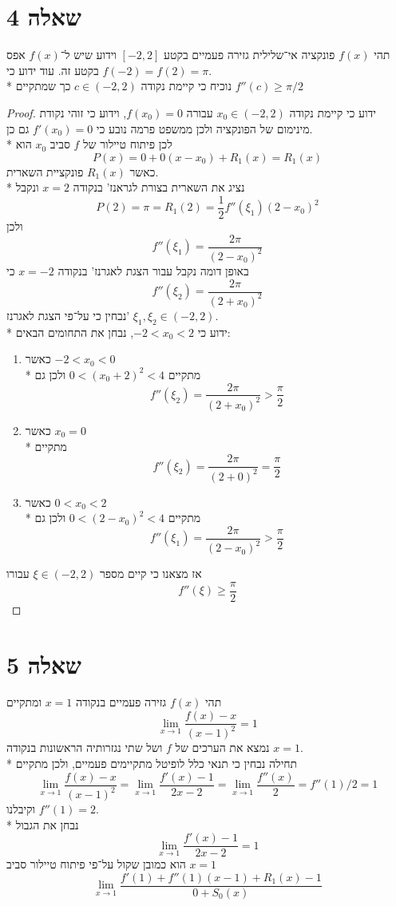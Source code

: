 \section{שאלה 4}
תהי $f(x)$ פונקציה אי־שלילית גזירה פעמיים בקטע $[-2, 2]$ וידוע שיש ל־$f(x)$ אפס בקטע זה. עוד ידוע כי $f(-2) = f(2) = \pi$. \\*
נוכיח כי קיימת נקודה $c \in (-2, 2)$ כך שמתקיים $f''(c) \ge \pi/2$
\begin{proof}
	ידוע כי קיימת נקודה $x_0 \in (-2, 2)$ עבורה $f(x_0) = 0$, וידוע כי זוהי נקודת מינימום של הפונקציה ולכן ממשפט פרמה נובע כי $f'(x_0) = 0$ גם כן. \\*
	לכן פיתוח טיילור של $f$ סביב $x_0$ הוא
	\[
		P(x) = 0 + 0(x - x_0) + R_1(x) = R_1(x)
	\]
	כאשר $R_1(x)$ פונקציית השארית. \\*
	נציג את השארית בצורת לגראנז' בנקודה $x = 2$ ונקבל
	\[
		P(2) = \pi = R_1(2) = \frac{1}{2} f''(\xi_1) {(2 - x_0)}^2
	\]
	ולכן
	\[
		f''(\xi_1) = \frac{2 \pi}{{(2 - x_0)}^2}
	\]
	באופן דומה נקבל עבור הצגת לאגרנז' בנקודה $x = -2$ כי
	\[
		f''(\xi_2) = \frac{2 \pi}{{(2 + x_0)}^2}
	\]
	נבחין כי על־פי הצגת לאגרנז' $\xi_1, \xi_2 \in (-2, 2)$. \\*
	ידוע כי $-2 < x_0 < 2$, נבחן את התחומים הבאים:
	\begin{enumerate}
		\item כאשר $-2 < x_0 < 0$ \\*
			מתקיים $0 < {(x_0 + 2)}^2 < 4$ ולכן גם
			\[
				f''(\xi_2) = \frac{2 \pi}{{(2 + x_0)}^2} > \frac{\pi}{2}
			\]
		\item כאשר $x_0 = 0$ \\*
			מתקיים
			\[
				f''(\xi_2) = \frac{2\pi}{{(2 + 0)}^2} = \frac{\pi}{2}
			\]
		\item כאשר $0 < x_0 < 2$ \\*
			מתקיים $0 < {(2 - x_0)}^2 < 4$ ולכן גם
			\[
				f''(\xi_1) = \frac{2 \pi}{{(2 - x_0)}^2} > \frac{\pi}{2}
			\]
	\end{enumerate}
	אז מצאנו כי קיים מספר $\xi \in (-2, 2)$ עבורו
	\[
		f''(\xi) \ge \frac{\pi}{2}
	\]
\end{proof}

\section{שאלה 5}
תהי $f(x)$ גזירה פעמיים בנקודה $x = 1$ ומתקיים
\[
	\lim_{x \to 1} \frac{ f(x) - x }{ {(x - 1)}^2 } = 1
\]
נמצא את הערכים של $f$ ושל שתי נגזרותיה הראשונות בנקודה $x = 1$. \\*
תחילה נבחין כי תנאי כלל לופיטל מתקיימים פעמיים, ולכן מתקיים
\[
	\lim_{x \to 1} \frac{ f(x) - x }{ {(x - 1)}^2 }
	= \lim_{x \to 1} \frac{ f'(x) - 1 }{ 2x - 2 }
	= \lim_{x \to 1} \frac{ f''(x) }{ 2 }
	= f''(1) / 2 = 1
\]
וקיבלנו $f''(1) = 2$. \\*
נבחן את הגבול
\[
	\lim_{x \to 1} \frac{ f'(x) - 1 }{ 2x - 2 } = 1
\]
הוא כמובן שקול על־פי פיתוח טיילור סביב $x = 1$
\[
	\lim_{x \to 1} \frac{ f'(1) + f''(1)(x - 1) + R_1(x) - 1 }{ 0 + S_0(x) }
\]


